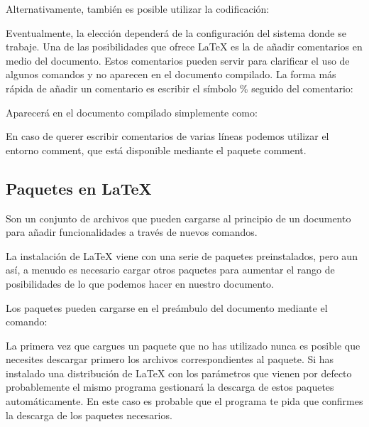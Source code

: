 \documentclass[11pt, a4paper]{article}
\begin{document}

Alternativamente, también es posible utilizar la codificación:


Eventualmente, la elección dependerá de la configuración del sistema donde se trabaje.
Una de las posibilidades que ofrece LaTeX es la de añadir comentarios en medio del documento. Estos comentarios pueden servir para clarificar el uso de algunos comandos y no aparecen en el documento compilado. La forma más rápida de añadir un comentario es escribir el símbolo \% seguido del comentario:

	 

Aparecerá en el documento compilado simplemente como:


En caso de querer escribir comentarios de varias líneas podemos utilizar el entorno comment, que está disponible mediante el paquete comment.







\subsection{Paquetes en LaTeX}

Son un conjunto de archivos que pueden cargarse al principio de un documento para añadir funcionalidades a través de nuevos comandos.

La instalación de LaTeX viene con una serie de paquetes preinstalados, pero aun así, a menudo es necesario cargar otros paquetes para aumentar el rango de posibilidades de lo que podemos hacer en nuestro documento.

Los paquetes pueden cargarse en el preámbulo del documento mediante el comando:


La primera vez que cargues un paquete que no has utilizado nunca es posible que necesites descargar primero los archivos correspondientes al paquete. Si has instalado una distribución de LaTeX con los parámetros que vienen por defecto probablemente el mismo programa gestionará la descarga de estos paquetes automáticamente. En este caso es probable que el programa te pida que confirmes la descarga de los paquetes necesarios.
\end{document}
